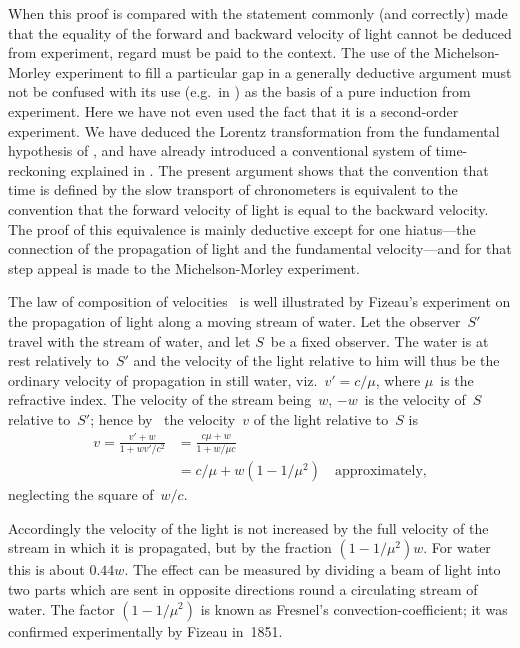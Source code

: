 \documentclass[12pt]{book}
\begin{document}
When this proof is compared with the statement commonly (and correctly)
made that the equality of the forward and backward velocity of light cannot
be deduced from experiment, regard must be paid to the context. The use
of the Michelson-Morley experiment to fill a particular gap in a generally
deductive argument must not be confused with its use (e.g.\ in ) as the basis of a pure induction from experiment. Here we
have not even used the fact that it is a second-order experiment. We have
deduced the Lorentz transformation from the fundamental hypothesis of ,
and have already introduced a conventional system of time-reckoning explained
in . The present argument shows that the convention that time is defined
by the slow transport of chronometers is equivalent to the convention that
the forward velocity of light is equal to the backward velocity. The proof of
%
this equivalence is mainly deductive except for one hiatus---the connection
of the propagation of light and the fundamental velocity---and for that step
appeal is made to the Michelson-Morley experiment.

The law of composition of velocities~ is well illustrated by Fizeau's
%
%
experiment on the propagation of light along a moving stream of water. Let
the observer~$S'$ travel with the stream of water, and let $S$~be a fixed observer.
The water is at rest relatively to~$S'$ and the velocity of the light relative to
him will thus be the ordinary velocity of propagation in still water, viz.\
$v' = c/\mu$, where $\mu$~is the refractive index. The velocity of the stream being~$w$,
$-w$~is the velocity of~$S$ relative to~$S'$; hence by~\Eq{(6.2)} the velocity~$v$ of the
light relative to~$S$ is
\begin{align*}
  v = \frac{v' + w}{1 + wv'/c^{2}}
  &= \frac{c\mu + w}{1 + w/\mu c} \\
  &= c/\mu + w(1 - 1/\mu^{2})\quad\text{approximately,}
\end{align*}
neglecting the square of~$w/c$.

Accordingly the velocity of the light is not increased by the full velocity
of the stream in which it is propagated, but by the fraction $(1 - 1/\mu^{2}) w$. For
water this is about $0.44 w$. The effect can be measured by dividing a beam
of light into two parts which are sent in opposite directions round a circulating
stream of water. The factor $(1 - 1/\mu^{2})$ is known as Fresnel's convection-coefficient;
\index{Fresnel's convection-coefficient}%
it was confirmed experimentally by Fizeau in~1851.
\end{document}
